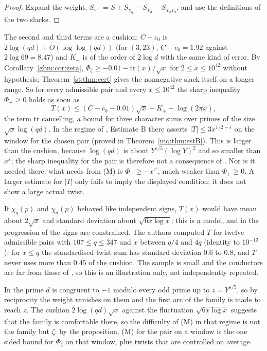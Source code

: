 \begin{proof}
Expand the weight, $S_{w_+}=S+S_{\chi_q}-S_{\chi_d}-S_{\chi_q\chi_d}$, and use the definitions of the two slacks.
\end{proof}

The second and third terms are a cushion: $C-c_0$ is $2\log(qd)+O(\log\log(qd))$ (for $(3,23)$, $C-c_0=1.92$ against $2\log69=8.47$) and $K_+$ is of the order of $2\log d$ with the same kind of error. By Corollary~\ref{gbm:cor:zeta}, $\Phi_\zeta\ge-0.01-\mathrm{tr}(x)/\sqrt x$ for $2\le x\le10^{42}$ without hypothesis; Theorem~\ref{st:thm:cert} gives the nonnegative slack itself on a longer range. So for every admissible pair and every $x\le10^{42}$ the sharp inequality $\Phi_+\ge0$ holds as soon as
\[
T(x)\le(C-c_0-0.01)\sqrt x+K_+-\log(2\pi x),
\]
the term $\mathrm{tr}$ cancelling, a bound for three character sums over primes of the size $\sqrt x\log(qd)$. In the regime of \cite{Rub26}, Estimate B there asserts $|T|\le3x^{1/2+\varepsilon}$ on the window for the chosen pair (proved in Theorem~\ref{mq:thm:estB}). This is larger than the cushion, because $\log(qd)$ is about $Y^{\varepsilon/5}(\log Y)^2$ and so smaller than $x^\varepsilon$; the sharp inequality for the pair is therefore not a consequence of \cite{Rub26}. Nor is it needed there: what \cite{Rub26} needs from (M) is $\Phi_+\ge-x^{\varepsilon'}$, much weaker than $\Phi_+\ge0$. A larger estimate for $|T|$ only fails to imply the displayed condition; it does not show a large actual twist.

If $\chi_q(p)$ and $\chi_d(p)$ behaved like independent signs, $T(x)$ would have mean about $2\sqrt x$ and standard deviation about $\sqrt{6x\log x}$; this is a model, and in the progression of \cite{Rub26} the signs are constrained. The authors computed $T$ for twelve admissible pairs with $107\le q\le347$ and $x$ between $q/4$ and $4q$ (identity to $10^{-13}$): for $x\le q$ the standardised twist sum has standard deviation $0.6$ to $0.8$, and $T$ never uses more than $0.45$ of the cushion. The sample is small and the conductors are far from those of \cite{Rub26}, so this is an illustration only, not independently repeated.

In \cite{Rub26} the prime $d$ is congruent to $-1$ modulo every odd prime up to $z=Y^{\varepsilon/5}$, so by reciprocity the weight vanishes on them and the first arc of the family is made to reach $z$. The cushion $2\log(qd)\sqrt x$ against the fluctuation $\sqrt{6x\log x}$ suggests that the family is comfortable there, so the difficulty of (M) in that regime is not the family but $\zeta$: by the proposition, (M) for the pair on a window is the one sided bound for $\Phi_\zeta$ on that window, plus twists that are controlled on average.

